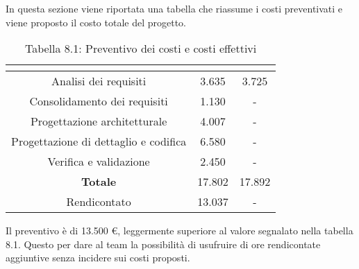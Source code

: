 In questa sezione viene riportata una tabella che riassume i costi preventivati e viene proposto il costo totale del progetto.
\\
\renewcommand{\arraystretch}{1.5}
\begin{table}[H]
\begin{center}
\begin{tabular}{|c|c|c|}
\hline
\rowcolor{title_row}
\textbf{\color{title_text}{Periodo}}  & \textbf{\color{title_text}{Preventivo \euro}} & \textbf{\color{title_text}{Consuntivo \euro}} \\ \hline
Analisi dei requisiti   & 3.635 & 3.725 \\ \hline
Consolidamento dei requisiti   & 1.130 & - \\ \hline
Progettazione architetturale    & 4.007 & - \\ \hline
Progettazione di dettaglio e codifica    & 6.580 & - \\ \hline
Verifica e validazione    & 2.450 & - \\ \hline
\textbf{Totale}   & 17.802 & 17.892 \\ \hline
Rendicontato   & 13.037 & - \\ \hline
\end{tabular}
\caption{Tabella 8.1: Preventivo dei costi e costi effettivi\label{}}
\end{center}
\end{table}
\renewcommand{\arraystretch}{1}

Il preventivo è di 13.500 \euro{}, leggermente superiore al valore segnalato nella tabella 8.1. Questo per dare al team la possibilità di usufruire di ore rendicontate aggiuntive senza incidere sui costi proposti.  
\newpage
